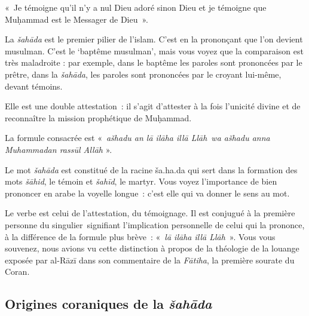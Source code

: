 «~Je témoigne qu'il n'y a nul Dieu adoré sinon Dieu et je témoigne que
Muḥammad est le Messager de Dieu~».





La \emph{šahāda} est le premier pilier de l'islam. C'est en la
prononçant que l'on devient musulman. C'est le `baptême musulman', mais
vous voyez que la comparaison est très maladroite : par exemple, dans le
baptême les paroles sont prononcées par le prêtre, dans la
\emph{šahāda}, les paroles sont prononcées par le croyant lui-même,
devant témoins.

Elle est une double attestation~: il s'agit d'attester à la fois
l'unicité divine et de reconnaître la mission prophétique de Muḥammad.

La formule consacrée est «~\emph{ašhadu an lā ilāha illā Llāh}~\emph{wa
ašhadu anna Muhammadan rassūl Allāh} ».

Le mot \emph{šahāda} est constitué de la racine ša.ha.da qui sert dans
la formation des mots \emph{šāhid}, le témoin et \emph{šahīd}, le
martyr. Vous voyez l'importance de bien prononcer en arabe la voyelle
longue~: c'est elle qui va donner le sens au mot.

Le verbe est celui de l'attestation, du témoignage. Il est conjugué à la
première personne du singulier~signifiant l'implication personnelle de
celui qui la prononce, à la différence de la formule plus brève~:
«~\emph{lā ilāha illā Llāh}~». Vous vous souvenez, nous avions vu cette
distinction à propos de la théologie de la louange exposée par al-Rāzī
dans son commentaire de la \emph{Fātiha}, la première sourate du Coran.


\subsection{Origines coraniques de la
\emph{šahāda}}


